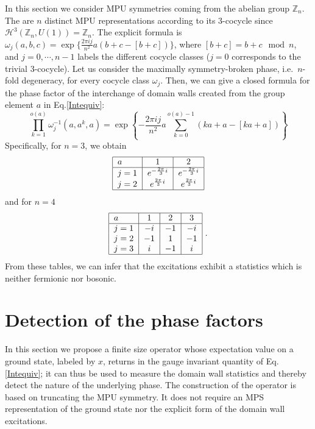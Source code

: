 \documentclass[aps,pra,export,nofootinbib]{revtex4-2}
\begin{document}
In this section we consider MPU symmetries coming from the abelian group $\mathbb{Z}_n$. The are $n$ distinct MPU representations according to its $3$-cocycle since $\mathcal{H}^3(\mathbb{Z}_n,U(1)) = \mathbb{Z}_n$. The explicit formula is $\omega_j(a,b,c)= \exp\{\frac{2 \pi i j}{n^2}a(b+c-[b+c])\}$, where $[b+c] = b+c  \mod n$, and $j=0,\cdots, n-1$ labels the different cocycle classes ($j=0$ corresponds to the trivial 3-cocycle). Let us consider the maximally symmetry-broken phase, i.e.\ $n$-fold degeneracy, for every cocycle class $\omega_j$. Then, we can give a closed formula for the phase factor of the interchange of domain walls created from the group element $a$ in Eq.\eqref{Intequiv}:
 $$\prod_{k=1}^{o(a)} \omega_j^{-1}(a,a^k,a) = \exp\left \{- \frac{2 \pi i j}{n^2}a\sum_{k=0}^{o(a)-1}\left ( ka+a-[ka+a]\right )\right \}$$
%
Specifically, for $n=3$, we obtain  
\begin{equation}
\begin{tabular}{|l|c|c|}
\hline
$a$ & $1 $   & $2 $  \\
\hline
$j=1$     & $e^{-\frac{2\pi}{3}i} $ & $e^{-\frac{2\pi}{3}i}$   \\
$j=2  $   & $e^{\frac{2\pi}{3}i} $& $e^{\frac{2\pi}{3}i}$   \\
\hline
\end{tabular}
\end{equation}
and for $n=4$ 
\begin{equation}
\begin{tabular}{|l|c|c|c|}
\hline
$a$ & $1 $   & $2 $ & $3 $   \\
\hline
$j=1$     & $-i $ & $-1 $ & $-i$   \\
$j=2  $   & $-1 $ & $1 $ & $-1$   \\
$j=3  $   & $i $ & $-1 $ & $i$   \\
\hline
\end{tabular}\ .
\end{equation}
From these tables, we can infer that the excitations exhibit a statistics which is neither fermionic nor bosonic.

\section{Detection of the phase factors}

In this section we propose a finite size operator whose expectation value on a ground state, labeled by $x$, returns in the gauge invariant quantity of Eq.\eqref{Intequiv}; it can thus be used to measure the domain wall statistics and 
thereby detect the nature of the underlying phase. The construction of the
operator is based on truncating the MPU symmetry. It does not require an MPS representation of the ground state nor the explicit form of the domain wall excitations. 
\end{document}
